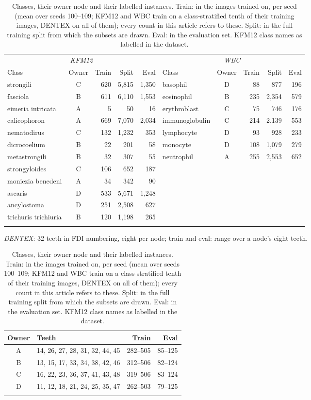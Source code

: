 \documentclass[pdflatex,sn-mathphys-num]{sn-jnl}
\begin{document}
\begin{table}[t]
\caption{Classes, their owner node and their labelled instances. Train: in the images trained on, per seed (mean over seeds 100--109; KFM12 and WBC train on a class-stratified tenth of their training images, DENTEX on all of them); every count in this article refers to these. Split: in the full training split from which the subsets are drawn. Eval: in the evaluation set. KFM12 class names as labelled in the dataset.}\label{tab:classes}
\footnotesize
\setlength{\tabcolsep}{3pt}
\begin{tabular*}{\textwidth}{@{\extracolsep\fill}lcrrr@{\hspace{10pt}}lcrrr}
\toprule
\multicolumn{5}{c}{\emph{KFM12}} & \multicolumn{5}{c}{\emph{WBC}} \\
\cmidrule(lr){1-5}\cmidrule(lr){6-10}
Class & Owner & Train & Split & Eval & Class & Owner & Train & Split & Eval \\
\midrule
strongili & C & 620 & 5,815 & 1,350 & basophil & D & 88 & 877 & 196 \\
fasciola & B & 611 & 6,110 & 1,553 & eosinophil & B & 235 & 2,354 & 579 \\
eimeria intricata & A & 5 & 50 & 16 & erythroblast & C & 75 & 746 & 176 \\
calicophoron & A & 669 & 7,070 & 2,034 & immunoglobulin & C & 214 & 2,139 & 553 \\
nematodirus & C & 132 & 1,232 & 353 & lymphocyte & D & 93 & 928 & 233 \\
dicrocoelium & B & 22 & 201 & 58 & monocyte & D & 108 & 1,079 & 279 \\
metastrongili & B & 32 & 307 & 55 & neutrophil & A & 255 & 2,553 & 652 \\
strongyloides & C & 106 & 652 & 187 &  & & & &  \\
moniezia benedeni & A & 34 & 342 & 90 &  & & & &  \\
ascaris & D & 533 & 5,671 & 1,248 &  & & & &  \\
ancylostoma & D & 251 & 2,508 & 627 &  & & & &  \\
trichuris trichiuria & B & 120 & 1,198 & 265 &  & & & &  \\
\botrule
\end{tabular*}

\medskip
\noindent\emph{DENTEX}: 32 teeth in FDI numbering, eight per node; train and eval: range over a node's eight teeth.\par\smallskip
\begin{tabular*}{\textwidth}{@{\extracolsep\fill}clrr}
\toprule
Owner & Teeth & Train & Eval \\
\midrule
A & 14, 26, 27, 28, 31, 32, 44, 45 & 282--505 & 85--125 \\
B & 13, 15, 17, 33, 34, 38, 42, 46 & 312--506 & 82--124 \\
C & 16, 22, 23, 36, 37, 41, 43, 48 & 319--506 & 83--124 \\
D & 11, 12, 18, 21, 24, 25, 35, 47 & 262--503 & 79--125 \\
\botrule
\end{tabular*}
\end{table}
\end{document}
